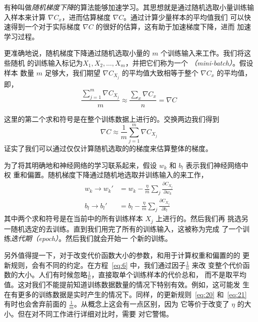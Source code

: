 有种叫做\emph{随机梯度下降}的算法能够加速学习。其思想就是通过随机选取小量训练输
入样本来计算 $\nabla C_x$，进而估算梯度 $\nabla C$。通过计算少量样本的平均值我们
可以快速得到一个对于实际梯度 $\nabla C$ 的很好的估算，这有助于加速梯度下降，进而
加速学习过程。

更准确地说，随机梯度下降通过随机选取小量的 $m$ 个训练输入来工作。我们将这些随机
的训练输入标记为$X_1, X_2, \ldots, X_m$，并把它们称为一个%
\emph{\minibatch{}\index{\minibatch}（\emph{mini-batch}）}。假设样本
数量 $m$ 足够大，我们期望 $\nabla C_{X_j}$ 的平均值大致相等于整个 $\nabla C_x$
的平均值，即，
\begin{equation}
  \frac{\sum_{j=1}^m \nabla C_{X_{j}}}{m} \approx \frac{\sum_x \nabla C_x}{n} = \nabla C
  \label{eq:18}\tag{18}
\end{equation}

这里的第二个求和符号是在整个训练数据上进行的。交换两边我们得到
\begin{equation}
  \nabla C \approx \frac{1}{m} \sum_{j=1}^m \nabla C_{X_{j}}
  \label{eq:19}\tag{19}
\end{equation}
证实了我们可以通过仅仅计算随机选取的\minibatch{}的梯度来估算整体的梯度。

为了将其明确地和神经网络的学习联系起来，假设 $w_k$ 和 $b_l$ 表示我们神经网络中权
重和偏置。随机梯度下降通过随机地选取并训练输入的\minibatch{}来工作，
\begin{align}
  \label{eq:20}w_k \rightarrow w_k' &= w_k-\frac{\eta}{m}
                                      \sum_j \frac{\partial C_{X_j}}{\partial w_k}
                                      \tag{20}\\
  \label{eq:21}b_l \rightarrow b_l' &= b_l-\frac{\eta}{m}
                                      \sum_j \frac{\partial C_{X_j}}{\partial b_l}
                                      \tag{21}
\end{align}
其中两个求和符号是在当前\minibatch{}中的所有训练样本 $X_j$ 上进行的。然后我们再
挑选另一随机选定的\minibatch{}去训练。直到我们用完了所有的训练输入，这被称为完成
了一个训练\emph{迭代期（\emph{epoch}）}。然后我们就会开始一
个新的训练\epoch{}。

另外值得提一下，对于改变代价函数大小的参数，和用于计算权重和偏置的\minibatch{}的
更新规则，会有不同的约定。在方程~\eqref{eq:6} 中，我们通过因子$\frac{1}{n}$ 来改
变整个代价函数的大小。人们有时候忽略$\frac{1}{n}$，直接取单个训练样本的代价总和，
而不是取平均值。这对我们不能提前知道训练数据数量的情况下特别有效。例如，这可能发
生在有更多的训练数据是实时产生的情况下。同样，\minibatch{}的更新规则~\eqref{eq:20}
和~\eqref{eq:21} 有时也会舍弃前面的 $\frac{1}{m}$。从概念上这会有一点区别，因为
它等价于改变了\learningrate{} $\eta$ 的大小。但在对不同工作进行详细对比时，需要
对它警惕。

